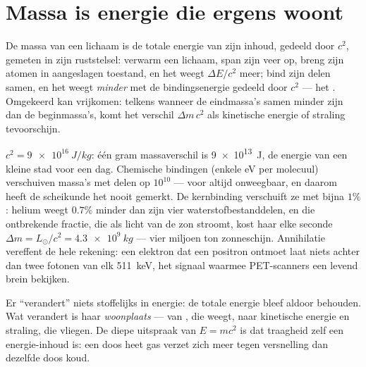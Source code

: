 \section{Massa is energie die ergens woont}

\begin{theorem}\label{thm:b3:relativistic-dynamics:emc2}
De massa van een lichaam is de totale energie van zijn inhoud, gedeeld
door $c^2$, gemeten in zijn ruststelsel: verwarm een lichaam, span zijn
veer op, breng zijn atomen in aangeslagen toestand, en het weegt
$\Delta E/c^2$ meer; bind zijn delen samen, en het weegt \emph{minder}
met de bindingsenergie gedeeld door $c^2$ --- het \emph{}.
Omgekeerd kan  vrijkomen: telkens wanneer de eindmassa's samen
minder zijn dan de beginmassa's, komt het verschil $\Delta m\,c^2$ als
kinetische energie of straling tevoorschijn.
\end{theorem}
\admitted

\begin{example}\label{ex:b3:relativistic-dynamics:ledger}
$c^2 = \qty{9e16}{J/kg}$: één gram massaverschil is \qty{9e13}{J}, de
energie van een kleine stad voor een dag. Chemische bindingen (enkele eV
per molecuul) verschuiven massa's met delen op $10^{10}$ --- voor altijd
onweegbaar, en daarom heeft de scheikunde het nooit gemerkt. De
kernbinding verschuift ze met bijna $1\%$: helium weegt $0.7\%$ minder
dan zijn vier waterstofbestanddelen, en die ontbrekende fractie, die als
licht van de zon stroomt, kost haar elke seconde $\Delta m = L_\odot/c^2 =
\qty{4.3e9}{kg}$ --- vier miljoen ton zonneschijn. Annihilatie
vereffent de hele rekening: een elektron dat een positron ontmoet laat
niets achter dan twee fotonen van elk \qty{511}{keV}, het signaal waarmee
PET-scanners een levend brein bekijken.
\end{example}

\begin{remark}\label{rem:b3:relativistic-dynamics:conversion}
Er ``verandert'' niets stoffelijks in energie: de totale energie bleef
aldoor behouden. Wat verandert is haar \emph{woonplaats} --- van
, die weegt, naar kinetische energie en straling, die vliegen.
De diepe uitspraak van $E = mc^2$ is dat traagheid zelf een
energie-inhoud is: een doos heet gas verzet zich meer tegen versnelling
dan dezelfde doos koud.
\end{remark}


